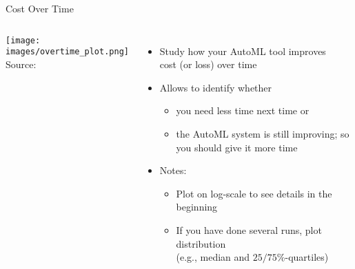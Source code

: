 \begin{frame}[c]{Cost Over Time}

\begin{columns}

\begin{center}
	\texttt{[image: images/overtime\_plot.png]}\\
	Source: 
\end{center}


\begin{itemize}
	\item Study how your AutoML tool improves\\ cost (or loss) over time
	\pause
	\item Allows to identify whether 
	\begin{itemize}
		\item you need less time next time or 
		\pause
		\item the AutoML system is still improving; so you should give it more time
	\end{itemize}
	\pause
	\item \alert{Notes}: 
	\begin{itemize}
		\item Plot on log-scale to see details in the beginning
		\item  If you have done several runs, plot distribution\\ (e.g., median and $25/75\%$-quartiles)
	\end{itemize}
\end{itemize}
	
\end{columns}

\end{frame}

